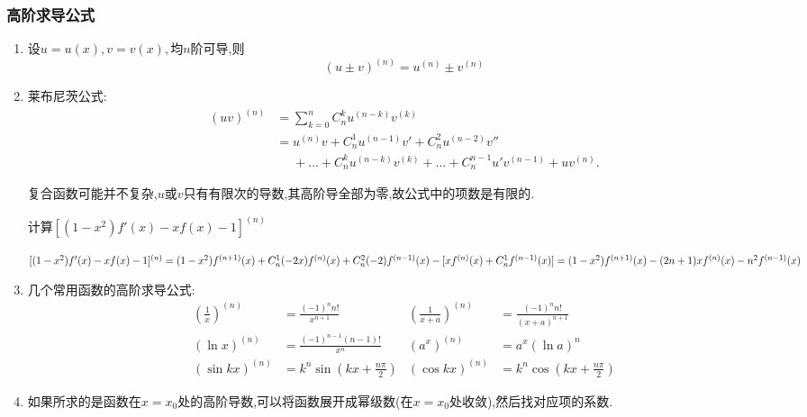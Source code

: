 \subsubsection{高阶求导公式}
\begin{enumerate}
\item 设$u=u(x),v=v(x),$均$n$阶可导,则
\begin{equation*}
    (u\pm v)^{(n)}=u^{(n)}\pm v^{(n)}
\end{equation*}

\item 莱布尼茨公式:
\begin{align*}
    (uv)^{(n)}&=\sum^{n}_{k=0}C^k_nu^{(n-k)}v^{(k)}\\
    &=u^{(n)}v+C^1_nu^{(n-1)}v'+C^2_nu^{(n-2)}v''\\ 
    &\phantom{=}+\dots +C^k_nu^{(n-k)}v^{(k)}+\dots +C^{n-1}_nu'v^{(n-1)}+uv^{(n)}.
\end{align*}

复合函数可能并不复杂,$u$或$v$只有有限次的导数,其高阶导全部为零,故公式中的项数是有限的.

\begin{examp}{计算$[(1-x^2)f'(x)-xf(x)-1]^{(n)}$}

    \jie $[(1-x^2)f'(x)-xf(x)-1]^{(n)}\\
    =(1-x^2)f^{(n+1)}(x)+C_n^1(-2x)f^{(n)}(x)+C_n^2(-2)f^{(n-1)}(x)-[xf^{(n)}(x)+C_n^1f^{(n-1)}(x)]\\
    =(1-x^2)f^{(n+1)}(x)-(2n+1)xf^{(n)}(x)-n^2f^{(n-1)}(x)$
\end{examp}

\item 几个常用函数的高阶求导公式:
\begin{align*}
    \left(\frac{1}{x}\right) ^{(n)} &=\frac{(-1)^nn!}{x^{n+1}} & 
    \left(\frac{1}{x+a}\right) ^{(n)} &=\frac{(-1)^nn!}{(x+a)^{n+1}}\\
    (\ln x)^{(n)} &=\frac{(-1)^{n-1}(n-1)!}{x^{n}}& 
    (a^x)^{(n)} &=a^x(\ln a)^n \\
    (\sin kx)^{(n)} &=k^n\sin \left(kx+\frac{n\pi}{2}\right)  & 
    (\cos kx)^{(n)} &=k^n\cos \left(kx+\frac{n\pi}{2}\right) 
\end{align*}

\item 如果所求的是函数在$x=x_0$处的高阶导数,可以将函数展开成幂级数(在$x=x_0$处收敛),然后找对应项的系数.
\end{enumerate}
